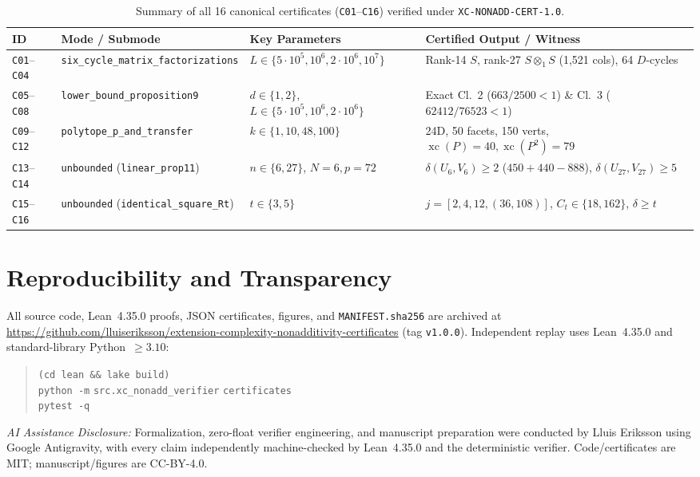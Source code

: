 \documentclass[10pt,twocolumn]{article}
\begin{document}
\begin{table}[tb]
\centering
\caption{Summary of all 16 canonical certificates (\texttt{C01}--\texttt{C16}) verified under \texttt{XC-NONADD-CERT-1.0}.}
\label{tab:certs}
\scriptsize
\setlength{\tabcolsep}{4pt}
\begin{tabular}{@{}llll@{}}
\toprule
ID & Mode / Submode & Key Parameters & Certified Output / Witness \\
\midrule
\texttt{C01}--\texttt{C04} & \texttt{six\_cycle\_matrix\_factorizations} & $L \in \{5\cdot 10^5, 10^6, 2\cdot 10^6, 10^7\}$ & Rank-14 $S$, rank-27 $S\otimes_1 S$ (1,521 cols), 64 $D$-cycles \\
\texttt{C05}--\texttt{C08} & \texttt{lower\_bound\_proposition9} & $d \in \{1,2\}$, $L \in \{5\cdot 10^5, 10^6, 2\cdot 10^6\}$ & Exact Cl.~2 ($663/2500<1$) \& Cl.~3 ($62412/76523<1$) \\
\texttt{C09}--\texttt{C12} & \texttt{polytope\_p\_and\_transfer} & $k \in \{1, 10, 48, 100\}$ & 24D, 50 facets, 150 verts, $\operatorname{xc}(P)=40, \operatorname{xc}(P^2)=79$ \\
\texttt{C13}--\texttt{C14} & \texttt{unbounded} (\texttt{linear\_prop11}) & $n \in \{6, 27\}$, $N=6, p=72$ & $\delta(U_6,V_6)\geq 2$ ($450+440-888$), $\delta(U_{27},V_{27})\geq 5$ \\
\texttt{C15}--\texttt{C16} & \texttt{unbounded} (\texttt{identical\_square\_Rt}) & $t \in \{3, 5\}$ & $j = [2,4,12,(36,108)]$, $C_t \in \{18, 162\}$, $\delta \geq t$ \\
\bottomrule
\end{tabular}
\end{table}

\section{Reproducibility and Transparency}
All source code, Lean~4.35.0 proofs, JSON certificates, figures, and \texttt{MANIFEST.sha256} are archived at \url{https://github.com/lluiseriksson/extension-complexity-nonadditivity-certificates} (tag \texttt{v1.0.0}). Independent replay uses Lean~4.35.0 and standard-library Python~$\geq 3.10$:
\begin{quote}\small\raggedright
\texttt{(cd lean \&\& lake build)}\\
\texttt{python -m} \nolinkurl{src.xc_nonadd_verifier} \texttt{certificates}\\
\texttt{pytest -q}
\end{quote}
\noindent\textit{AI Assistance Disclosure:} Formalization, zero-float verifier engineering, and manuscript preparation were conducted by Lluis Eriksson using Google Antigravity, with every claim independently machine-checked by Lean~4.35.0 and the deterministic verifier. Code/certificates are MIT; manuscript/figures are CC-BY-4.0.
\end{document}
